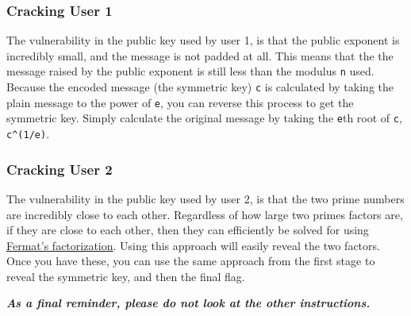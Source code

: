 {                        \subsubsection*{Cracking User 1}
                            The vulnerability in the public key used by user 1, is that the public exponent is incredibly small, and the message is not padded at all. This means that the the message raised by the public exponent is still less than the modulus \lstinline`n` used. Because the encoded message (the symmetric key) \lstinline`c` is calculated by taking the plain message to the power of \lstinline`e`, you can reverse this process to get the symmetric key. Simply calculate the original message by taking the \lstinline`e`th root of \lstinline`c`, \lstinline`c^(1/e)`.
                        \subsubsection*{Cracking User 2}
                            The vulnerability in the public key used by user 2, is that the two prime numbers are incredibly close to each other. Regardless of how large two primes factors are, if they are close to each other, then they can efficiently be solved for using \href{https://en.wikipedia.org/wiki/Fermat%27s_factorization_method}{Fermat's factorization}. Using this approach will easily reveal the two factors. Once you have these, you can use the same approach from the first stage to reveal the symmetric key, and then the final flag.

                    \textbf{\textit{As a final reminder, please do not look at the other instructions.}}
            }
\newpage
{}\label{subsec:CTFs-gb}


    \label{subsubsec:CTFs-gb-instructions}

